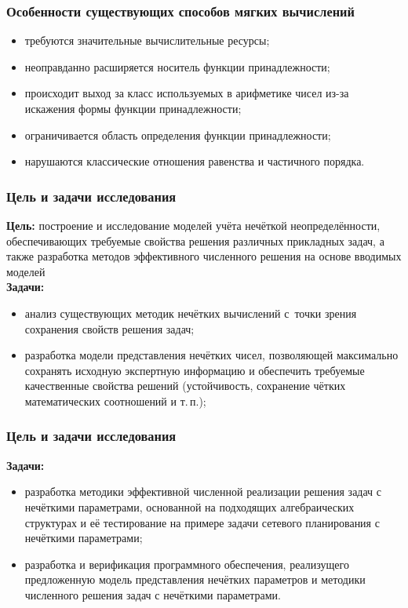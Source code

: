 \documentclass[12pt]{beamer}
\begin{document}
\begin{frame}
  \frametitle{Особенности существующих способов мягких вычислений}
  \begin{itemize}
    \item требуются значительные вычислительные ресурсы;
    \item неоправданно расширяется носитель функции принадлежности;
    \item происходит выход за класс используемых в арифметике чисел из-за искажения формы функции принадлежности;
    \item ограничивается область определения функции принадлежности;
    \item нарушаются классические отношения равенства и частичного порядка.
  \end{itemize}
\end{frame}

\begin{frame}
  \frametitle{Цель и задачи исследования}
  \textbf{Цель:} построение и исследование моделей учёта нечёткой неопределённости, обеспечивающих требуемые свойства решения различных прикладных задач, а также разработка методов эффективного численного решения на основе вводимых моделей \\
  \textbf{Задачи:}
  \begin{itemize}
    \item анализ существующих методик нечётких вычислений с~точки зрения сохранения свойств решения задач;
    \item разработка модели представления нечётких чисел, позволяющей максимально сохранять исходную экспертную информацию и обеспечить требуемые качественные свойства решений (устойчивость, сохранение чётких математических соотношений и т.\,п.);
  \end{itemize}  
\end{frame}

\begin{frame}
  \frametitle{Цель и задачи исследования}
  \textbf{Задачи:}
  \begin{itemize}
    \item разработка методики эффективной численной реализации решения задач с нечёткими параметрами, основанной на подходящих алгебраических структурах и её тестирование на примере задачи сетевого планирования с нечёткими параметрами;
    \item разработка и верификация программного обеспечения, реализущего предложенную модель представления нечётких параметров и методики численного решения задач с нечёткими параметрами.
  \end{itemize}  
\end{frame}
\end{document}
